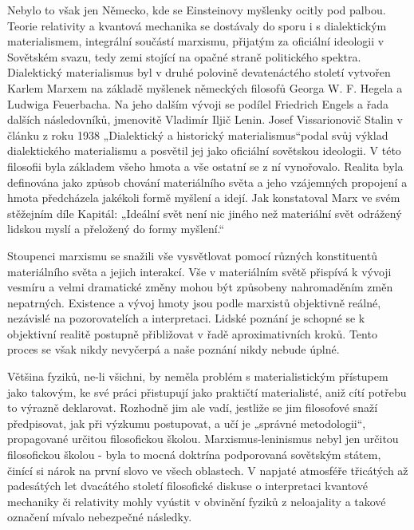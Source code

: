   Nebylo to však jen Německo, kde se Einsteinovy myšlenky ocitly pod palbou. Teorie relativity a
  kvantová mechanika se dostávaly do sporu i s dialektickým materialismem, integrální součástí
  marxismu, přijatým za oficiální ideologii v Sovětském svazu, tedy zemi stojící na opačné straně
  politického spektra. Dialektický materialismus byl v druhé polovině devatenáctého století vytvořen
  Karlem Marxem na základě myšlenek německých filosofů Georga W. F. Hegela a Ludwiga Feuerbacha. Na
  jeho dalším vývoji se podílel Friedrich Engels a řada dalších následovníků, jmenovitě Vladimír
  Iljič Lenin. Josef Vissarionovič Stalin v článku z roku 1938 „Dialektický a historický
  materialismus“podal svůj výklad dialektického materialismu a posvětil jej jako oficiální sovětskou
  ideologii. V této filosofii byla základem všeho hmota a vše ostatní se z ní vynořovalo. Realita
  byla definována jako způsob chování materiálního světa a jeho vzájemných propojení a hmota
  předcházela jakékoli formě myšlení a idejí. Jak konstatoval Marx ve svém stěžejním díle Kapitál:
  „Ideální svět není nic jiného než materiální svět odrážený lidskou myslí a přeložený do formy
  myšlení.“
  
  Stoupenci marxismu se snažili vše vysvětlovat pomocí různých konstituentů materiálního světa a
  jejich interakcí. Vše v materiálním světě přispívá k vývoji vesmíru a velmi dramatické změny mohou
  být způsobeny nahromaděním změn nepatrných. Existence a vývoj hmoty jsou podle marxistů objektivně
  reálné, nezávislé na pozorovatelích a interpretaci. Lidské poznání je schopné se k objektivní
  realitě postupně přibližovat v řadě aproximativních kroků. Tento proces se však nikdy nevyčerpá a
  naše poznání nikdy nebude úplné. 
  
  Většina fyziků, ne-li všichni, by neměla problém s materialistickým přístupem jako takovým, ke své
  práci přistupují jako praktičtí materialisté, aniž cítí potřebu to výrazně deklarovat. Rozhodně
  jim ale vadí, jestliže se jim filosofové snaží předpisovat, jak při výzkumu postupovat, a učí je
  „správné metodologii“, propagované určitou filosofickou školou. Marxismus-leninismus nebyl jen
  určitou filosofickou školou - byla to mocná doktrína podporovaná sovětským státem, činící si nárok
  na první slovo ve všech oblastech. V napjaté atmosféře třicátých až padesátých let dvacátého
  století filosofické diskuse o interpretaci kvantové mechaniky či relativity mohly vyústit v
  obvinění fyziků z neloajality a takové označení mívalo nebezpečné následky. 
  

